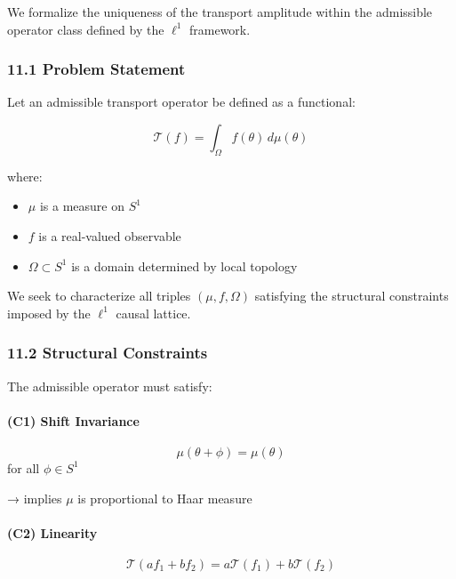 \documentclass[
]{article}
\providecommand{\tightlist}{%
  \setlength{\itemsep}{0pt}\setlength{\parskip}{0pt}}
\begin{document}
We formalize the uniqueness of the transport amplitude within the
admissible operator class defined by the \(\ell^1\) framework.

\hypertarget{problem-statement}{%
\subsubsection{11.1 Problem Statement}\label{problem-statement}}

Let an admissible transport operator be defined as a functional:

\[
\mathcal{T}(f) = \int_{\Omega} f(\theta) \, d\mu(\theta)
\]

where:

\begin{itemize}
\tightlist
\item
  \(\mu\) is a measure on \(S^1\)
\item
  \(f\) is a real-valued observable
\item
  \(\Omega \subset S^1\) is a domain determined by local topology
\end{itemize}

We seek to characterize all triples \((\mu, f, \Omega)\) satisfying the
structural constraints imposed by the \(\ell^1\) causal lattice.

\hypertarget{structural-constraints}{%
\subsubsection{11.2 Structural
Constraints}\label{structural-constraints}}

The admissible operator must satisfy:

\hypertarget{c1-shift-invariance}{%
\paragraph{(C1) Shift Invariance}\label{c1-shift-invariance}}

\[
\mu(\theta + \phi) = \mu(\theta)
\] for all \(\phi \in S^1\)

→ implies \(\mu\) is proportional to Haar measure

\hypertarget{c2-linearity}{%
\paragraph{(C2) Linearity}\label{c2-linearity}}

\[
\mathcal{T}(a f_1 + b f_2) = a \mathcal{T}(f_1) + b \mathcal{T}(f_2)
\]
\end{document}
